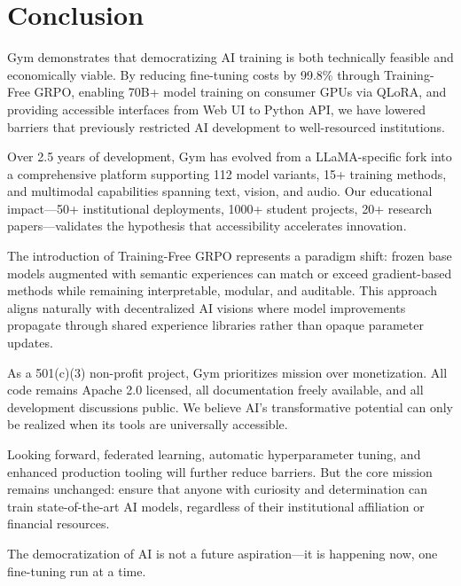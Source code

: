 \section{Conclusion}


Gym demonstrates that democratizing AI training is both technically feasible and economically viable. By reducing fine-tuning costs by 99.8\% through Training-Free GRPO, enabling 70B+ model training on consumer GPUs via QLoRA, and providing accessible interfaces from Web UI to Python API, we have lowered barriers that previously restricted AI development to well-resourced institutions.

Over 2.5 years of development, Gym has evolved from a LLaMA-specific fork into a comprehensive platform supporting 112 model variants, 15+ training methods, and multimodal capabilities spanning text, vision, and audio. Our educational impact—50+ institutional deployments, 1000+ student projects, 20+ research papers—validates the hypothesis that accessibility accelerates innovation.

The introduction of Training-Free GRPO represents a paradigm shift: frozen base models augmented with semantic experiences can match or exceed gradient-based methods while remaining interpretable, modular, and auditable. This approach aligns naturally with decentralized AI visions where model improvements propagate through shared experience libraries rather than opaque parameter updates.

As a 501(c)(3) non-profit project, Gym prioritizes mission over monetization. All code remains Apache 2.0 licensed, all documentation freely available, and all development discussions public. We believe AI's transformative potential can only be realized when its tools are universally accessible.

Looking forward, federated learning, automatic hyperparameter tuning, and enhanced production tooling will further reduce barriers. But the core mission remains unchanged: ensure that anyone with curiosity and determination can train state-of-the-art AI models, regardless of their institutional affiliation or financial resources.

The democratization of AI is not a future aspiration—it is happening now, one fine-tuning run at a time.

